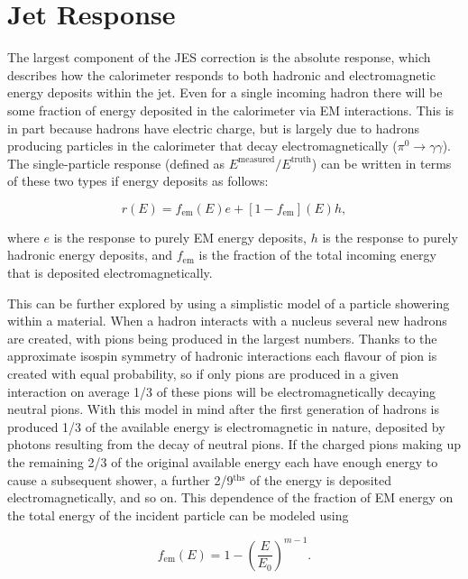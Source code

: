 \section{Jet Response}
\label{sec:JetResponse}
The largest component of the JES correction is the absolute response, which describes how the calorimeter responds to both hadronic and electromagnetic energy deposits within the jet.  
Even for a single incoming hadron there will be some fraction of energy deposited in the calorimeter via EM interactions.  
This is in part because hadrons have electric charge, but is largely due to hadrons producing particles in the calorimeter that decay electromagnetically ($\pi^0\rightarrow\gamma\gamma$).  
The single-particle response (defined as $E^{\mathrm {measured}} / E^{\mathrm {truth}}$) can be written in terms of these two types if energy deposits as follows:

\begin{equation}
  \label{SingleParticleResponse}
  r(E)=f_{\mathrm{em}}\left(E\right)e+\left[1-f_{\mathrm{em}}\right]\left(E\right)h,
 \end{equation}

\noindent
where $e$ is the response to purely EM energy deposits, $h$ is the response to purely hadronic energy deposits, and $f_{\mathrm{em}}$ is the fraction of the total incoming energy that is deposited electromagnetically.  

This can be further explored by using a simplistic model of a particle showering within a material.  
When a hadron interacts with a nucleus several new hadrons are created, with pions being produced in the largest numbers.  
Thanks to the approximate isospin symmetry of hadronic interactions each flavour of pion is created with equal probability, so if only pions are produced in a given interaction on average 1/3 of these pions will be electromagnetically decaying neutral pions.  
With this model in mind after the first generation of hadrons is produced 1/3 of the available energy is electromagnetic in nature, deposited by photons resulting from the decay of neutral pions.  
If the charged pions making up the remaining 2/3 of the original available energy each have enough energy to cause a subsequent shower, a further 2/9$^{\mathrm{ths}}$ of the energy is deposited electromagnetically, and so on.  
This dependence of the fraction of EM energy on the total energy of the incident particle can be modeled using

\begin{equation}
  \label{Grooms}
  f_{\mathrm{em}}\left(E\right)=1-\left(\frac{E}{E_0}\right)^{m-1}.
\end{equation} 

